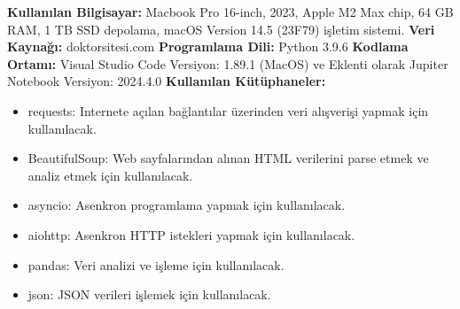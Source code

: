 \textbf{Kullanılan Bilgisayar:} Macbook Pro 16-inch, 2023, Apple M2 Max chip, 64 GB RAM, 1 TB SSD depolama, macOS Version 14.5 (23F79) işletim sistemi.
\newline
\textbf{Veri Kaynağı:} doktorsitesi.com
\newline
\textbf{Programlama Dili:} Python 3.9.6
\newline
\textbf{Kodlama Ortamı:} Visual Studio Code Versiyon: 1.89.1 (MacOS) ve Eklenti olarak Jupiter Notebook Versiyon: 2024.4.0
\newline
\textbf{Kullanılan Kütüphaneler:}
\begin{itemize}
  \item requests: Internete açılan bağlantılar üzerinden veri alışverişi yapmak için kullanılacak.
  \item BeautifulSoup: Web sayfalarından alınan HTML verilerini parse etmek ve analiz etmek için kullanılacak.
  \item asyncio: Asenkron programlama yapmak için kullanılacak.
  \item aiohttp: Asenkron HTTP istekleri yapmak için kullanılacak.
  \item pandas: Veri analizi ve işleme için kullanılacak.
  \item json: JSON verileri işlemek için kullanılacak.
\end{itemize}
